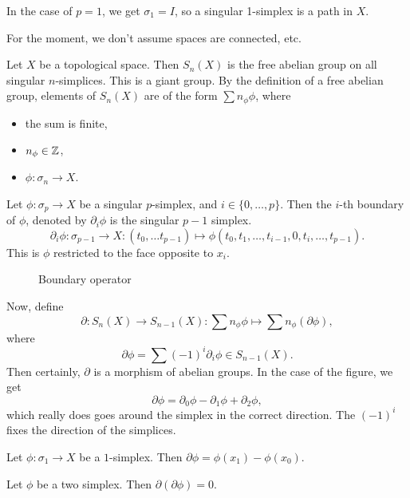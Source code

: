 In the case of $p=1$, we get $\sigma_1 = I$, so a singular 1-simplex is a path in $X$.

For the moment, we don't assume spaces are connected, etc.
\begin{definition}
    Let $X$ be a topological space.
    Then $S_n(X)$ is the free abelian group on all singular $n$-simplices.
    This is a giant group.
    By the definition of a free abelian group, elements of $S_n(X)$ are of the form $\sum n_\phi \phi$, where
     \begin{itemize}
         \item the sum is finite,
         \item $n_\phi \in \mathbb{Z}$,
         \item $\phi: \sigma_n \to X$.
    \end{itemize}
\end{definition}

Let $\phi: \sigma_p \to  X$ be a singular $p$-simplex, and $i \in  \{0, \ldots, p\}$.
Then the $i$-th boundary of $\phi$, denoted by $\partial_i \phi$ is the singular $p-1$ simplex.
\[
    \partial_i \phi: \sigma_{p-1} \to  X: (t_0, \ldots t_{p-1}) \mapsto \phi(t_0, t_1, \ldots, t_{i-1}, 0, t_i, \ldots, t_{p-1})
.\]
This is $\phi$ restricted to the face opposite to $x_i$.

\begin{figure}[H]
    \centering
    \caption{Boundary operator}
    \label{fig:boundary-operator}
\end{figure}

Now, define \[
    \partial: S_n(X) \to  S_{n-1}(X): \sum n_\phi \phi \mapsto \sum n_\phi (\partial \phi),
 \]
 where
 \[
     \partial \phi = \sum (-1)^{i}  \partial_i \phi \in S_{n-1}(X)
 .\] 
 Then certainly, $\partial$ is a morphism of abelian groups.
 In the case of the figure, we get
 \[
 \partial \phi = \partial_0 \phi - \partial _1 \phi + \partial _2 \phi
 ,\] 
 which really does goes around the simplex in the correct direction. The $(-1)^{i}$ fixes the direction of the simplices.

 \begin{eg}
     Let $\phi: \sigma_1 \to X$ be a $1$-simplex.
     Then $\partial \phi = \phi(x_1)  - \phi(x_0)$.
 \end{eg}

 \begin{eg}
    Let $\phi$ be a two simplex.
    Then $\partial(\partial \phi) = 0$.
 \end{eg}

